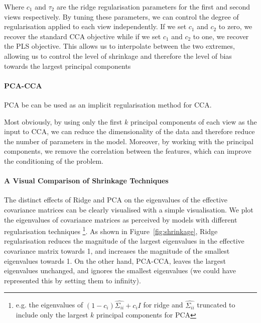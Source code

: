 Where $c_1$ and $\tau_2$ are the ridge regularisation parameters for the first and second views respectively.
By tuning these parameters, we can control the degree of regularisation applied to each view independently.
If we set $c_1$ and $c_2$ to zero, we recover the standard CCA objective while if we set $c_1$ and $c_2$ to one, we recover the PLS objective.
This allows us to interpolate between the two extremes, allowing us to control the level of shrinkage and therefore the level of bias towards the largest principal components

\paragraph{PCA-CCA} PCA be can be used as an implicit regularisation method for CCA.

Most obviously, by using only the first \( k \) principal components of each view as the input to CCA, we can reduce the dimensionality of the data and therefore reduce the number of parameters in the model.
Moreover, by working with the principal components, we remove the correlation between the features, which can improve the conditioning of the problem.

\paragraph{A Visual Comparison of Shrinkage Techniques}

The distinct effects of Ridge and PCA on the eigenvalues of the effective covariance matrices can be clearly visualised with a simple visualisation.
We plot the eigenvalues of covariance matrices as perceived by models with different regularisation techniques \footnote{e.g. the eigenvalues of $(1 - c_i) \hat{\Sigma_{ii}} + c_i I$ for ridge and $\hat{\Sigma_{ii}}$ truncated to include only the largest $k$ principal components for PCA}.
As shown in Figure~\ref{fig:shrinkage}, Ridge regularisation reduces the magnitude of the largest eigenvalues in the effective covariance matrix towards 1, and increases the magnitude of the smallest eigenvalues towards 1.
On the other hand, PCA-CCA, leaves the largest eigenvalues unchanged, and ignores the smallest eigenvalues (we could have represented this by setting them to infinity).

